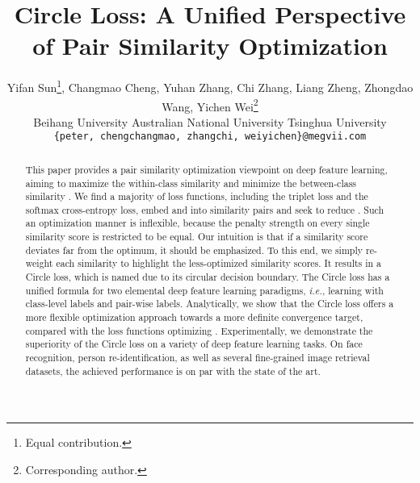 \documentclass[10pt,twocolumn,letterpaper]{article}
\begin{document}
\title{Circle Loss: A Unified Perspective of Pair Similarity Optimization}
\newcommand*\samethanks[1][\value{footnote}]{\footnotemark[#1]}
\author{{\fontsize{10.5}{12.6}\selectfont Yifan Sun\thanks{Equal contribution.}, Changmao Cheng\samethanks, Yuhan Zhang\samethanks, Chi Zhang, Liang Zheng, Zhongdao Wang, Yichen Wei\thanks{Corresponding author.}}\\
{\fontsize{10.5}{12.6}\selectfont {MEGVII Technology}
{Beihang University }
{Australian National University }
{Tsinghua University}}\\
{\texttt{\small{\{peter, chengchangmao, zhangchi, weiyichen\}@megvii.com}} \hspace{0.5cm}}\\
}
\maketitle
\thispagestyle{empty}

\begin{abstract}
This paper provides a pair similarity optimization viewpoint on deep feature learning, aiming to maximize the within-class similarity  and minimize the between-class similarity . We find a majority of loss functions, including the triplet loss and the softmax cross-entropy loss, embed  and  into similarity pairs and seek to reduce . Such an optimization manner is inflexible, because the penalty strength on every single similarity score is restricted to be equal. Our intuition is that if a similarity score deviates far from the optimum, it should be emphasized. 
To this end, we simply re-weight each similarity to highlight the less-optimized similarity scores. It results in a Circle loss, which is named due to its circular decision boundary. The Circle loss has a unified formula for two elemental deep feature learning paradigms, \emph {i.e.}, learning with class-level labels and pair-wise labels. Analytically, we show that the Circle loss offers a more flexible optimization approach towards a more definite convergence target, compared with the loss functions optimizing . Experimentally, we demonstrate the superiority of the Circle loss on a variety of deep feature learning tasks. On face recognition, person re-identification, as well as several fine-grained image retrieval datasets, the achieved performance is on par with the state of the art.
 
\end{abstract}
\end{document}

